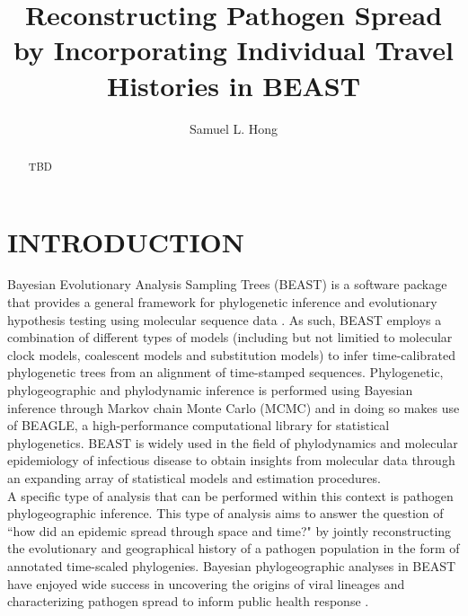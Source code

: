 \documentclass{article}
\title{Reconstructing Pathogen Spread by Incorporating Individual Travel Histories in BEAST}
\author{Samuel L. Hong}
\begin{document}
\maketitle

\begin{abstract}
\begin{adjustwidth}{0.5cm}{0.5cm}
TBD 
\end{adjustwidth}
\end{abstract}

\section*{INTRODUCTION}

Bayesian Evolutionary Analysis Sampling Trees (BEAST) \cite{beast110} is a software package that provides a general framework for phylogenetic inference and evolutionary hypothesis testing using molecular sequence data \cite{beastOG,beast17,beast110}.
As such, BEAST employs a combination of different types of models (including but not limitied to molecular clock models, coalescent models and substitution models) to infer time-calibrated phylogenetic trees from an alignment of time-stamped sequences.
Phylogenetic, phylogeographic and phylodynamic inference is performed using Bayesian inference through Markov chain Monte Carlo (MCMC) and in doing so makes use of BEAGLE, a high-performance computational library for statistical phylogenetics. %
BEAST is widely used in the field of phylodynamics and molecular epidemiology of infectious disease to obtain insights from molecular data through an expanding array of statistical models and estimation procedures. \\

A specific type of analysis that can be performed within this context is pathogen phylogeographic inference.
This type of analysis aims to answer the question of ``how did an epidemic spread through space and time?" by jointly reconstructing the evolutionary and geographical history of a pathogen population in the form of annotated time-scaled phylogenies.
Bayesian phylogeographic analyses in BEAST have enjoyed wide success in uncovering the origins of viral lineages \cite{hiv} and characterizing pathogen spread to inform public health response \cite{ebola}. \\
\end{document}
